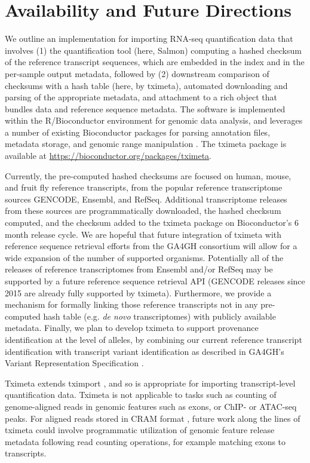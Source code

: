 \documentclass[10pt,letterpaper]{article}
\begin{document}
\section*{Availability and Future Directions}

We outline an implementation for importing RNA-seq quantification
data that involves (1) the quantification tool (here, Salmon)
computing a hashed checksum of the reference transcript sequences,
which are embedded in the index and in the per-sample output metadata,
followed by (2) downstream comparison of checksums with a hash table
(here, by tximeta), automated downloading and parsing of the
appropriate metadata, and attachment to a rich object that bundles
data and reference sequence metadata. The software is implemented
within the R/Bioconductor environment for genomic data analysis, and leverages
a number of existing Bioconductor packages for parsing annotation
files, metadata storage, and genomic range manipulation
\cite{bioc,ensembldb,biocfilecache,granges}. The tximeta package is
available at \url{https://bioconductor.org/packages/tximeta}.

Currently, the pre-computed hashed checksums are focused on human,
mouse, and fruit fly reference transcripts, from the popular reference
transcriptome sources GENCODE, Ensembl, and RefSeq. Additional
transcriptome releases from these sources are programmatically
downloaded, the hashed checksum computed, and the checksum added to
the tximeta package on Bioconductor's 6 month release cycle. We are
hopeful that future integration of tximeta with reference sequence
retrieval efforts from the GA4GH consortium will allow for a wide
expansion of the number of supported organisms. Potentially all of the
releases of reference transcriptomes from Ensembl and/or RefSeq may be
supported by a future reference sequence retrieval API (GENCODE
releases since 2015 are already fully supported by
tximeta). Furthermore, we provide a mechanism for formally linking
those reference transcripts not in any pre-computed hash table
(e.g. \textit{de novo} transcriptomes) with publicly available
metadata. Finally, we plan to develop tximeta to support provenance
identification at the level of alleles, by combining our current
reference transcript identification with transcript variant
identification as described in GA4GH's Variant Representation
Specification \cite{vr}.

Tximeta extends tximport \cite{tximport}, and so is
appropriate for importing transcript-level quantification data.
Tximeta is not applicable to tasks such as counting of
genome-aligned reads in genomic features such as exons, or ChIP- or
ATAC-seq peaks. For aligned reads stored in CRAM format \cite{cram},
future work along the lines of tximeta could involve programmatic
utilization of genomic feature release metadata following read
counting operations, for example matching exons to transcripts.
\end{document}
